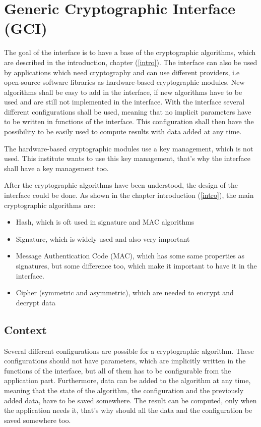 ﻿\chapter{Generic Cryptographic Interface (GCI)}
\label{gci}

The goal of the interface is to have a base of the cryptographic algorithms,
which are described in the introduction, chapter (\ref{intro}).
The interface can also be used by applications which need cryptography and can
use different providers, i.e open-source software libraries as hardware-based
cryptographic modules.
New algorithms shall be easy to add in the interface, if new algorithms have to
be used and are still not implemented in the interface.
With the interface several different configurations shall be used, meaning that
no implicit parameters have to be written in functions of the interface.
This configuration shall then have the possibility to be easily used to compute
results with data added at any time.

The hardware-based cryptographic modules use a key management, which is not
used.
This institute wants to use this key management, that's why the interface shall
have a key management too.

After the cryptographic algorithms have been understood, the design of the
interface could be done.
As shown in the chapter introduction (\ref{intro}), the main cryptographic
algorithms are:

\begin{itemize}[noitemsep]
  \item Hash, which is oft used in signature and MAC algorithms
  \item Signature, which is widely used and also very important
  \item Message Authentication Code (MAC), which has some same properties as
  signatures, but some difference too, which make it important to have it in the
  interface.
  \item Cipher (symmetric and asymmetric), which are needed to encrypt and
  decrypt data
\end{itemize}


\section{Context}
\label{gci_ctx}

Several different configurations are possible for a cryptographic algorithm.
These configurations should not have parameters, which are implicitly written in
the functions of the interface, but all of them has to be configurable from the
application part.
Furthermore, data can be added to the algorithm at any time, meaning that the
state of the algorithm, the configuration and the previously added data, have to
be saved somewhere. 
The result can be computed, only when the application needs it, that's why
should all the data and the configuration be saved somewhere too.

